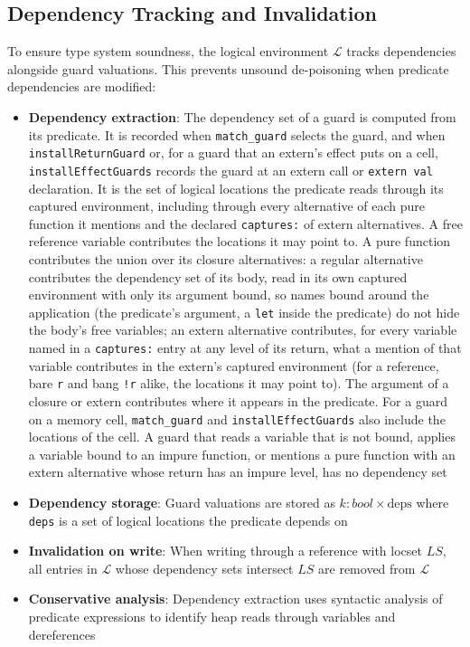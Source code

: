 \documentclass[12pt]{article}
\begin{document}
\subsection{Dependency Tracking and Invalidation}
\label{sec:dependency-tracking}

To ensure type system soundness, the logical environment $\mathcal{L}$ tracks
dependencies alongside guard valuations. This prevents unsound de-poisoning when
predicate dependencies are modified:

\begin{itemize}
    \item \textbf{Dependency extraction}: The dependency set of a guard is
    computed from its predicate. It is recorded when \texttt{match\_guard}
    selects the guard, and when \texttt{installReturnGuard} or, for a guard
    that an extern's effect puts on a cell, \texttt{installEffectGuards}
    records the guard at an extern call or \texttt{extern val} declaration.
    It is the set of logical locations the predicate reads through its
    captured environment, including through every alternative of each pure
    function it mentions and the declared \texttt{captures:} of extern
    alternatives. A free reference variable contributes the locations it may
    point to. A pure function contributes the union over its closure
    alternatives: a regular alternative contributes the dependency set of its
    body, read in its own captured environment with only its argument bound, so
    names bound around the application (the predicate's argument, a
    \texttt{let} inside the predicate) do not hide the body's free variables;
    an extern alternative contributes, for every variable named in a
    \texttt{captures:} entry at any level of its return, what a mention of that
    variable contributes in the extern's captured environment (for a reference,
    bare \texttt{r} and bang \texttt{!r} alike, the locations it may point to).
    The argument of a closure or extern contributes where it appears in the
    predicate. For a guard on a memory cell, \texttt{match\_guard} and
    \texttt{installEffectGuards} also include the locations of the cell.
    A guard that reads a variable that is not bound, applies a variable
    bound to an impure function, or mentions a pure function with an extern
    alternative whose return has an impure level, has no dependency set
    \item \textbf{Dependency storage}: Guard valuations are stored as $k : bool \times \text{deps}$ 
    where \texttt{deps} is a set of logical locations the predicate depends on
    \item \textbf{Invalidation on write}: When writing through a reference with locset $LS$, all entries in $\mathcal{L}$ 
    whose dependency sets intersect $LS$ are removed from $\mathcal{L}$
    \item \textbf{Conservative analysis}: Dependency extraction uses syntactic analysis of 
    predicate expressions to identify heap reads through variables and dereferences
\end{itemize}
\end{document}
